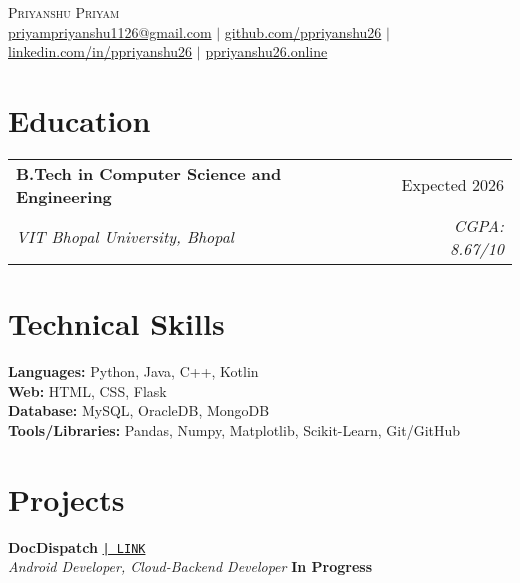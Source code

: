 \documentclass[a4paper,10pt]{article}
\makeatletter
\newcommand{\resumeSubheading}[4]{
  \vspace{1pt}\item
    \begin{tabular*}{\textwidth}{l@{\extracolsep{\fill}}r}
      \textbf{#1} & #2 \\
      \textit{\small#3} & \textit{\small #4} \\
    \end{tabular*}
}
\makeatother
\begin{document}
\begin{center}
  {\Huge \scshape Priyanshu Priyam} \\ \vspace{1pt}
  \href{mailto:priyampriyanshu1126@gmail.com}{priyampriyanshu1126@gmail.com} $|$
  \href{https://github.com/ppriyanshu26}{github.com/ppriyanshu26} $|$
  \href{https://linkedin.com/in/ppriyanshu26}{linkedin.com/in/ppriyanshu26} $|$
  \href{https://ppriyanshu26.online/}{ppriyanshu26.online}
\end{center}

\section{Education}

\vspace{-4pt}
\begin{flushleft}
  \hspace{1.5em}
  \resumeSubheading
    {B.Tech in Computer Science and Engineering}{Expected 2026}
    {VIT Bhopal University, Bhopal}{CGPA: 8.67/10}
\end{flushleft}

\section{Technical Skills}

\vspace{-4pt}
\hspace{1.5em}
\begin{flushleft}
  \textbf{Languages:} Python, Java, C++, Kotlin \\[6pt]
  \textbf{Web:} HTML, CSS, Flask \\[6pt]
  \textbf{Database:} MySQL, OracleDB, MongoDB \\[6pt]
  \textbf{Tools/Libraries:} Pandas, Numpy, Matplotlib, Scikit-Learn, Git/GitHub
\end{flushleft}



\section{Projects}

\noindent
\textbf{DocDispatch}
\href{https://github.com/yashpreeto7/DocDispatch}{\texttt{| LINK}} \\
\textit{Android Developer, Cloud-Backend Developer} \hfill \textbf{In Progress} \\[-8pt]
\end{document}
